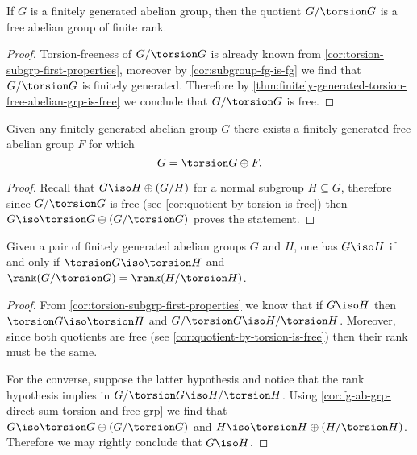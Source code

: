 \begin{corollary}
    \label{cor:quotient-by-torsion-is-free}
    If \(G\) is a finitely generated abelian group, then the quotient
    \(G/\torsion G\) is a free abelian group of finite rank.
\end{corollary}

\begin{proof}
    Torsion-freeness of \(G/\torsion G\) is already known from
    \cref{cor:torsion-subgrp-first-properties}, moreover by
    \cref{cor:subgroup-fg-is-fg} we find that \(G/\torsion G\) is finitely
    generated. Therefore by
    \cref{thm:finitely-generated-torsion-free-abelian-grp-is-free} we conclude that
    \(G/\torsion G\) is free.
\end{proof}

\begin{corollary}
    \label{cor:fg-ab-grp-direct-sum-torsion-and-free-grp}
    Given any finitely generated abelian group \(G\) there exists a finitely
    generated free abelian group \(F\) for which
    \[
        G = \torsion G \oplus F.
    \]
\end{corollary}

\begin{proof}
    Recall that \(G \iso H \oplus (G/H)\) for a normal subgroup \(H \subseteq G\),
    therefore since \(G/\torsion G\) is free (see
    \cref{cor:quotient-by-torsion-is-free}) then
    \(G \iso \torsion G \oplus (G/\torsion G)\) proves the statement.
\end{proof}

\begin{corollary}
    \label{cor:iso-fg-grps-iff-torsions-and-rank}
    Given a pair of finitely generated abelian groups \(G\) and \(H\), one has
    \(G \iso H\) if and only if \(\torsion G \iso \torsion H\) and
    \(\rank(G/\torsion G) = \rank(H/\torsion H)\).
\end{corollary}

\begin{proof}
    From \cref{cor:torsion-subgrp-first-properties} we know that if \(G \iso H\)
    then \(\torsion G \iso \torsion H\) and \(G/\torsion G \iso H/\torsion
    H\). Moreover, since both quotients are free (see
    \cref{cor:quotient-by-torsion-is-free}) then their rank must be the same.

    For the converse, suppose the latter hypothesis and notice that the rank
    hypothesis implies in \(G/\torsion G \iso H/\torsion H\). Using
    \cref{cor:fg-ab-grp-direct-sum-torsion-and-free-grp} we find that
    \(G \iso \torsion G \oplus (G/\torsion G)\) and
    \(H \iso \torsion H \oplus (H/\torsion H)\). Therefore we may rightly conclude
    that \(G \iso H\).
\end{proof}

